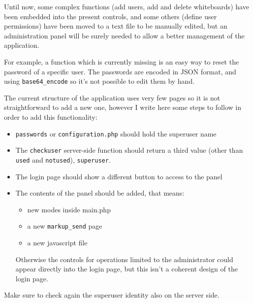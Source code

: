\documentclass[10pt,a4paper,english]{book}
\begin{document}
Until now, some complex functions (add users, add and delete
whiteboards) have been embedded into the present controls, and some
others (define user permissions) have been moved to a text file to be
manually edited, but an administration panel will be surely needed to
allow a better management of the application.

For example, a function which is currently missing is an easy way to
reset the password of a specific user. The passwords are encoded in
JSON format, and using \texttt{base64{\_}encode} so it's not possible to edit
them by hand.

The current structure of the application uses very few pages so it is
not straightforward to add a new one, however I write here some steps
to follow in order to add this functionality:
\begin{itemize}
\item {} 
\texttt{passwords} or \texttt{configuration.php} should hold the superuser
name

\item {} 
The \texttt{checkuser} server-side function should return a third value
(other than \texttt{used} and \texttt{notused}), \texttt{superuser}.

\item {} 
The login page should show a different button to access to the panel

\item {} 
The contents of the panel should be added, that means:
\begin{itemize}
\item {} 
new modes inside main.php

\item {} 
a new \texttt{markup{\_}send} page

\item {} 
a new javascript file

\end{itemize}

Otherwise the controls for operations limited to the administrator
could appear directly into the login page, but this isn't a coherent
design of the login page.

\end{itemize}

Make sure to check again the superuser identity also on the server
side.



\hypertarget{execution-of-the-whiteboard-as-a-cgi}{}
\end{document}
